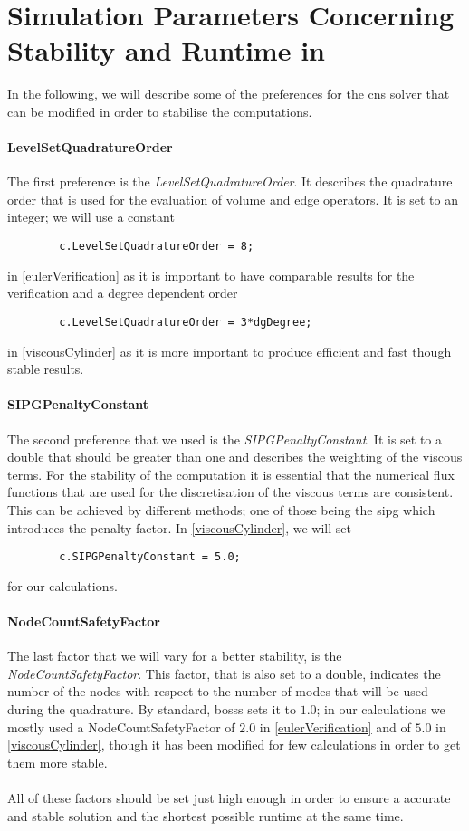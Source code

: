 	\section{Simulation Parameters Concerning Stability and Runtime in }
	\label{parameters}
	
	In the following, we will describe some of the preferences for the \gls{cns} solver that can be modified in order to stabilise the computations. 
	
	\paragraph{LevelSetQuadratureOrder}
	The first preference is the \textit{LevelSetQuadratureOrder}. It describes the quadrature order that is used for the evaluation of volume and edge operators. It is set to an integer; we will use a constant
	\begin{lstlisting}
		c.LevelSetQuadratureOrder = 8;
	\end{lstlisting}
	in \cref{eulerVerification} as it is important to have comparable results for the verification and a degree dependent order
	\begin{lstlisting}
		c.LevelSetQuadratureOrder = 3*dgDegree;
	\end{lstlisting}
	in \cref{viscousCylinder} as it is more important to produce efficient and fast though stable results. 
	
	\paragraph{SIPGPenaltyConstant}
	 The second preference that we used is the \textit{SIPGPenaltyConstant}. It is set to a double that should be greater than one and describes the weighting of the viscous terms. For the stability of the computation it is essential that the numerical flux functions that are used for the discretisation of the viscous terms are consistent. This can be achieved by different methods; one of those being the \gls{sipg} which introduces the penalty factor. In \cref{viscousCylinder}, we will set 
	 \begin{lstlisting}
		c.SIPGPenaltyConstant = 5.0;
	 \end{lstlisting}
	for our calculations.
		 
	\paragraph{NodeCountSafetyFactor}
	The last factor that we will vary for a better stability, is the \textit{NodeCountSafetyFactor}. This factor, that is also set to a double, indicates the number of the nodes with respect to the number of modes that will be used during the quadrature. By standard, \gls{bosss} sets it to $1.0$; in our calculations we mostly used a NodeCountSafetyFactor of $2.0$  in \cref{eulerVerification} and of $5.0$ in \cref{viscousCylinder}, though it has been modified for few calculations in order to get them more stable.\\\\
	
     All of these factors should be set just high enough in order to ensure a accurate and stable solution and the shortest possible runtime at the same time. 
     

	